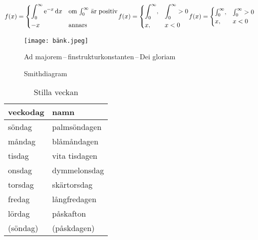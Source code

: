 \documentclass[a4paper, article]{memoir}
\begin{document}
\begin{subequations}
\begin{align}
  f(x) =
  \begin{dcases*}
      \int_0^\infty \mathrm{e}^{-x}\,\mathrm{d}x & om $\int_0^\infty$ är positiv\\
    -x & annars
  \end{dcases*}
\end{align}

\begin{align}
  f(x) =
  \begin{dcases}
    \int_0^\infty, & \int_0^\infty > 0 \\
    x, & x < 0
  \end{dcases}
\end{align}

\begin{align}
  f(x) =
  \begin{cases}
    \int_0^\infty, & \int_0^\infty > 0 \\
    x, & x < 0
  \end{cases}
\end{align}
\end{subequations}

\begin{figure}[ht]
\centering
\texttt{[image: bänk.jpeg]}
\caption{Ad majorem\,--\,finstrukturkonstanten\,--\,Dei gloriam}
\label{fig:bänk}
\end{figure}

\begin{figure}[ht]
\centering

\caption{Smithdiagram}
\label{fig:smith}
\end{figure}

\begin{table}[ht]  
\centering
\begin{tabular}{ll}
\toprule
veckodag & namn \\
\midrule
söndag & palmsöndagen \\
måndag & blåmåndagen \\
tisdag & vita tisdagen \\
onsdag & dymmelonsdag \\
torsdag & skärtorsdag \\
fredag & långfredagen \\
lördag & påskafton \\
(söndag) & (påskdagen) \\
\bottomrule
\end{tabular}
\caption{Stilla veckan}
\label{tab:stilla}
\end{table}
\end{document}
